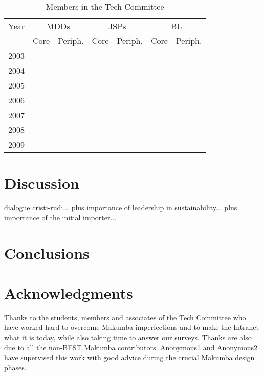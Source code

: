 \documentclass{acm_proc_article-sp}
\begin{document}

\begin{table}\label{tab:itd-members}
	\centering
	\caption{Members in the Tech Committee}
	\begin{tabular}{c|r|r|r|r|r|r}
		\hline
		\hline
		Year 		& \multicolumn{2}{c}{MDDs} 	& \multicolumn{2}{c}{JSPs}	& \multicolumn{2}{c}{BL} 	\\
					& Core		&	Periph.		& Core		&	Periph.		& Core		&	Periph.		\\
		\hline
		\hline
		2003		& 						&  \\
		\hline
		2004		& 						&  \\
		\hline
		2005		& 						&  \\
		\hline
		2006		& 						&  \\
		\hline
		2007		& 						&  \\
		\hline
		2008		& 						&  \\
		\hline
		2009		& 						&  \\
		\hline
		\hline
	\end{tabular}
\end{table} 

\section{Discussion}\label{sec:disco}
dialogue cristi-rudi... plus importance of leadership in sustainability... plus importance of the initial importer...


\section{Conclusions}\label{sec:conclusions}

\section{Acknowledgments}\label{sec:acknowledgments}
Thanks to the students, members and associates of the Tech Committee who have worked hard to overcome Makumba imperfections and to make the Intranet what it is today, while also taking time to answer our surveys.  Thanks are also due to all the non-BEST Makumba contributors.  Anonymous1 and Anonymous2 have supervised this work with good advice during the crucial Makumba design phases.

%

 

%

\balancecolumns
\end{document}
